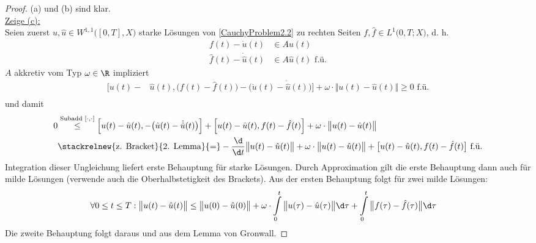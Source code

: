 \begin{proof}
(a) und (b) sind klar.\\

\underline{Zeige (c):}\\
Seien zuerst $u,\hat{u}\in W^{1,1}\big([0,T],X\big)$ starke Lösungen von \eqref{CauchyProblem2.2} zu rechten Seiten $f,\hat{f}\in L^1\big(0,T;X\big)$, d. h.
\begin{align*}
f(t)-\dot{u}(t)&\in A u(t)\\
\hat{f}(t)-\dot{\hat{u}}(t)&\in A\hat{u}(t)\text{ f.ü.}
\end{align*}
$A$ akkretiv vom Typ $\omega\in\R$ impliziert
\begin{align*}
\Big[u(t)-&\hat{u}(t),\big(f(t)-\hat{f}(t)\big)-\big(\dot{u}(t)-\dot{\hat{u}}(t)\big)\Big]+\omega\cdot\big\Vert u(t)-\hat{u}(t)\big\Vert\geq0\text{ f.ü.}\\
\end{align*}
und damit
\begin{align*}
0&\stackrel{\text{Subadd }[\cdot,\cdot]}{\leq}
\Big[u(t)-\hat{u}(t),-\big(\hat{u}(t)-\dot{\hat{u}}(t)\big)\Big]+
\Big[u(t)-\hat{u}(t),f(t)-\hat{f}(t)\Big]+
\omega\cdot\big\Vert u(t)-\hat{u}(t)\big\Vert\\
&\stackrelnew{\text{z. Bracket}}{\text{2. Lemma}}{=}
-\frac{\d}{\d t}\big\Vert u(t)-\hat{u}(t)\big\Vert+\omega\cdot\big\Vert u(t)-\hat{u}(t)\big\Vert+\big[u(t)-\hat{u}(t),f(t)-\hat{f}(t)\big]\text{ f.ü.}
\end{align*}
Integration dieser Ungleichung liefert erste Behauptung für starke Lösungen. Durch Approximation gilt die erste Behauptung dann auch für milde Lösungen (verwende auch die Oberhalbstetigkeit des Brackets). Aus der ersten Behauptung folgt für zwei milde Lösungen:
\begin{align*}
\forall 0\leq t\leq T:
\big\Vert u(t)-\hat{u}(t)\big\Vert
&\leq\big\Vert u(0)-\hat{u}(0)\big\Vert+\omega\cdot\int\limits_0^t\big\Vert u(\tau)-\hat{u}(\tau)\big\Vert\d\tau+\int\limits_0^t\big\Vert f(\tau)-\hat{f}(\tau)\big\Vert\d\tau
\end{align*}
Die zweite Behauptung folgt daraus und aus dem Lemma von Gronwall.


\end{proof}
